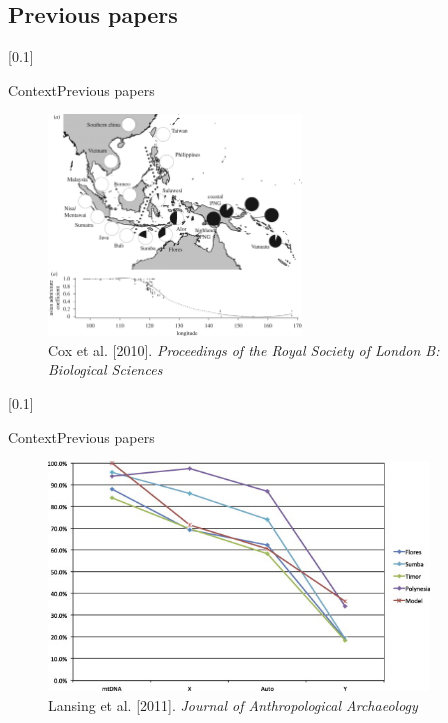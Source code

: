 \documentclass[10pt, aspectratio=43]{beamer}
\begin{document}
\subsection{Previous papers}
[0.1]{}{}{}
\begin{frame}{Context}{Previous papers}
\begin{center}
  \begin{figure}
    \includegraphics[width=0.6\textwidth]{../data/cox-image.jpg}
    \caption{Cox et al. [2010]. \textit{Proceedings of
the Royal Society of London B: Biological Sciences}}
  \end{figure}
\end{center}
\end{frame}
[0.1]{}{}{}
\begin{frame}{Context}{Previous papers}
\begin{center}
  \begin{figure}
    \includegraphics[width=0.9\textwidth]{../data/lansing-image.jpg}
    \caption{Lansing et al. [2011]. \textit{Journal of
Anthropological Archaeology}}
  \end{figure}
\end{center}
\end{frame}
\end{document}
